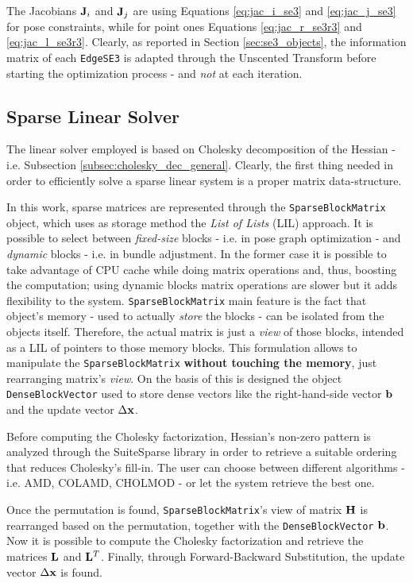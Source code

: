 The Jacobians $\mathbf{J}_i$ and $\mathbf{J}_j$ are using Equations \ref{eq:jac_i_se3} and \ref{eq:jac_j_se3} for pose constraints, while for point ones Equations \ref{eq:jac_r_se3r3} and \ref{eq:jac_l_se3r3}. Clearly, as reported in Section \ref{sec:se3_objects}, the information matrix of each \texttt{EdgeSE3} is adapted through the Unscented Transform before starting the optimization process - and \textit{not} at each iteration.

\subsection{Sparse Linear Solver}\label{subsec:sparse_linear_solver}
The linear solver employed is based on Cholesky decomposition of the Hessian - i.e. Subsection \ref{subsec:cholesky_dec_general}. Clearly, the first thing needed in order to efficiently solve a sparse linear system is a proper matrix data-structure.

In this work, sparse matrices are represented through the \texttt{SparseBlockMatrix} object, which uses as storage method the \textit{List of Lists} (LIL) approach. It is possible to select between \textit{fixed-size} blocks - i.e. in pose graph optimization - and \textit{dynamic} blocks - i.e. in bundle adjustment. In the former case it is possible to take advantage of CPU cache while doing matrix operations and, thus, boosting the computation; using dynamic blocks matrix operations are slower but it adds flexibility to the system. \texttt{SparseBlockMatrix} main feature is the fact that object's memory - used to actually \textit{store} the blocks - can be isolated from the objects itself. Therefore, the actual matrix is just a \textit{view} of those blocks, intended as a LIL of pointers to those memory blocks. This formulation allows to manipulate the \texttt{SparseBlockMatrix} \textbf{without touching the memory}, just rearranging matrix's \textit{view}. On the basis of this is designed the object \texttt{DenseBlockVector} used to store dense vectors like the right-hand-side vector $\mathbf{b}$ and the update vector $\Delta \mathbf{x}$.

Before computing the Cholesky factorization, Hessian's non-zero pattern is analyzed through the SuiteSparse library in order to retrieve a suitable ordering that reduces Cholesky's fill-in. The user can choose between different algorithms - i.e. AMD, COLAMD, CHOLMOD - or let the system retrieve the best one.

Once the permutation is found, \texttt{SparseBlockMatrix}'s view of matrix $\mathbf{H}$ is rearranged based on the permutation, together with the \texttt{DenseBlockVector} $\mathbf{b}$. Now it is possible to compute the Cholesky factorization and retrieve the matrices $\mathbf{L}$ and $\mathbf{L}^T$. Finally, through Forward-Backward Substitution, the update vector $\Delta \mathbf{x}$ is found.

